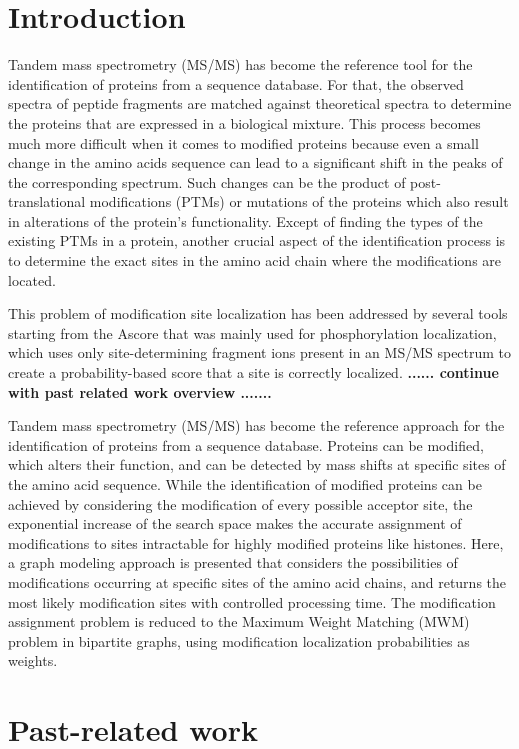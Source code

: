 \documentclass{bioinfo}
\begin{document}
\section{Introduction}

Tandem mass spectrometry (MS/MS) has become the reference tool for the identification of proteins from a sequence database. For that, the observed spectra of peptide fragments are matched against theoretical spectra to determine the proteins that are expressed in a biological mixture. This process becomes much more difficult when it comes to modified proteins because even a small change in the amino acids sequence can lead to a significant shift in the peaks of the corresponding spectrum. Such changes can be the product of post-translational modifications (PTMs) or mutations of the proteins which also result in alterations of the protein's functionality. Except of finding the types of the existing PTMs in a protein, another crucial aspect of the identification process is to determine the exact sites in the amino acid chain where the modifications are located. 

This problem of modification site localization has been addressed by several tools starting from the Ascore \citep{AScore} that was mainly used for phosphorylation localization, which uses only site-determining fragment ions present in an MS/MS spectrum to create a probability-based score that a site is correctly localized. {\bf ...... continue with past related work overview .......}


Tandem mass spectrometry (MS/MS) has become the reference approach for the identification of proteins from a sequence database. Proteins can be modified, which alters their function, and can be detected by mass shifts at specific sites of the amino acid sequence. While the identification of modified proteins can be achieved by considering the modification of every possible acceptor site, the exponential increase of the search space makes the accurate assignment of modifications to sites intractable for highly modified proteins like histones. 
Here, a graph modeling approach is presented that considers the possibilities of modifications occurring at specific sites of the amino acid chains, and returns the most likely modification sites with controlled processing time. The modification assignment problem is reduced to the Maximum Weight Matching (MWM) problem in bipartite graphs, using modification localization probabilities as weights.

\section{Past-related work}
\end{document}
